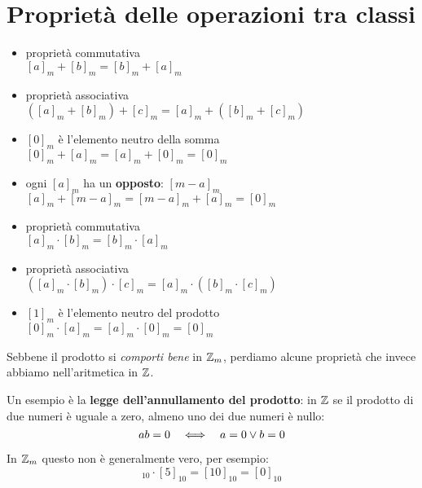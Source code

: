 \section{Proprietà delle operazioni tra classi}
\label{sec:proprieta_operazioni_classi}

\begin{teorema}
    \begin{itemize}
        \item proprietà commutativa \\ $[a]_m + [b]_m = [b]_m + [a]_m$
        \item proprietà associativa \\ $([a]_m + [b]_m) + [c]_m = [a]_m + ([b]_m + [c]_m)$
        \item $[0]_m$ è l'elemento neutro della somma \\ $[0]_m + [a]_m = [a]_m + [0]_m = [0]_m$
        \item ogni $[a]_m$ ha un \textbf{opposto}: $[m-a]_m$ \\ $[a]_m + [m-a]_m = [m-a]_m + [a]_m = [0]_m$
    \end{itemize}
\end{teorema}

\begin{teorema}
    \begin{itemize}
        \item proprietà commutativa \\ $[a]_m \cdot [b]_m = [b]_m \cdot [a]_m$
        \item proprietà associativa \\ $([a]_m \cdot [b]_m) \cdot [c]_m = [a]_m \cdot ([b]_m \cdot [c]_m)$
        \item $[1]_m$ è l'elemento neutro del prodotto \\ $[0]_m \cdot [a]_m = [a]_m \cdot [0]_m = [0]_m$
    \end{itemize}
\end{teorema}

Sebbene il prodotto si \emph{comporti bene} in $ \mathbb{Z} _m$, perdiamo alcune proprietà che invece
abbiamo nell'aritmetica in $ \mathbb{Z} $.

Un esempio è la \textbf{legge dell'annullamento del prodotto}: in $ \mathbb{Z} $ se il prodotto di due numeri è uguale a zero,
almeno uno dei due numeri è nullo:
\begin{equation*}
    ab = 0  \quad\Longleftrightarrow\quad  a = 0 \lor b = 0
\end{equation*}

In $ \mathbb{Z} _m$ questo non è generalmente vero, per esempio:
\begin{equation*}
    [2]_{10} \cdot [5]_{10} = [10]_{10} = [0]_{10}
\end{equation*}

